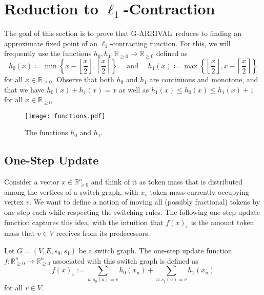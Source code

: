 \documentclass[a4paper,UKenglish,cleveref, autoref, thm-restate]{lipics-v2021}
\newcommand{\R}{\mathbb{R}}
\newcommand{\problem}[1]{\textrm{#1}}
\newcommand{\garrival}{\problem{G-ARRIVAL}}
\begin{document}
\section{Reduction to \texorpdfstring{$\ell_1$}{l1}-Contraction}
\label{sec:solving_arrival_via_contraction}

The goal of this section is to prove that \garrival\ reduces to finding an approximate fixed point of an $\ell_1$-contracting function. For this, we will frequently use the functions $h_0, h_1 : \R_{\geq 0} \rightarrow \R_{\geq 0}$ defined as 
\[
    h_0(x) \coloneqq \min \left\{ x - \left\lfloor \frac{x}{2} \right\rfloor, \left\lceil \frac{x}{2} \right\rceil  \right\}  \quad \text{ and } \quad h_1(x) \coloneqq \max \left\{ \left\lfloor \frac{x}{2} \right\rfloor, x - \left\lceil \frac{x}{2} \right\rceil \right\}
\]
for all $x \in \R_{\geq 0}$. Observe that both $h_0$ and $h_1$ are continuous and monotone, and that we have $h_0(x) + h_1(x) = x$ as well as $h_1(x) \leq h_0(x) \leq h_1(x) + 1$ for all $x \in \R_{\geq 0}$.

\begin{figure}[ht]
    \centering
    \texttt{[image: functions.pdf]}
    \caption{The functions $h_0$ and $h_1$.}
    \label{fig:enter-label}
\end{figure}

\subsection{One-Step Update}
\label{ssec:one-step_update}

Consider a vector $x \in \R^n_{\geq 0}$ and think of it as token mass that is distributed among the vertices of a switch graph, with $x_v$ token mass currently occupying vertex $v$. We want to define a notion of moving all (possibly fractional) tokens by one step each while respecting the switching rules. The following one-step update function captures this idea, with the intuition that $f(x)_v$ is the amount token mass that $v \in V$ receives from its predecessors.

\begin{definition}
    Let $G = (V, E, s_0, s_1)$ be a switch graph. The one-step update function $f : \R^{n}_{\geq 0} \rightarrow \R^{n}_{\geq 0}$ associated with this switch graph is defined as 
    \[
        f(x)_v := \sum_{u : s_0(u) = v} h_0(x_u) + \sum_{u : s_1(u) = v} h_1(x_u)
    \]
    for all $v \in V$.
\end{definition}
\end{document}
